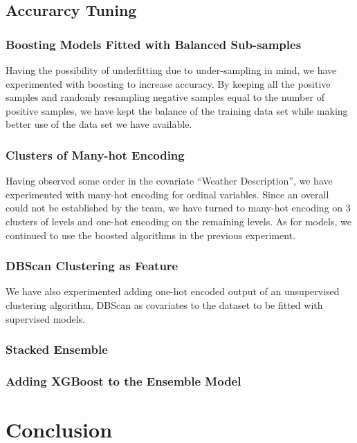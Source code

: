 \documentclass[10pt]{article}
\begin{document}
\subsection{Accurarcy Tuning}
\subsubsection{Boosting Models Fitted with Balanced Sub-samples}
Having the possibility of underfitting due to under-sampling in mind, we
have experimented with boosting to increase accuracy. By keeping all the
positive samples and randomly resampling negative samples equal to the
number of positive samples, we have kept the balance of the training data
set while making better use of the data set we have available.\par
\subsubsection{Clusters of Many-hot Encoding}
Having observed some order in the covariate ``Weather Description'', we
have experimented with many-hot encoding for ordinal variables. Since an
overall could not be established by the team, we have turned to many-hot
encoding on 3 clusters of levels and one-hot encoding on the remaining
levels. As for models, we continued to use the boosted algorithms in the
previous experiment.\par
\subsubsection{DBScan Clustering as Feature}
We have also experimented adding one-hot encoded output of an unsupervised
clustering algorithm, DBScan as covariates to the dataset to be fitted with
supervised models.
\subsubsection{Stacked Ensemble}
\subsubsection{Adding XGBoost to the Ensemble Model}

\section{Conclusion}
\end{document}
